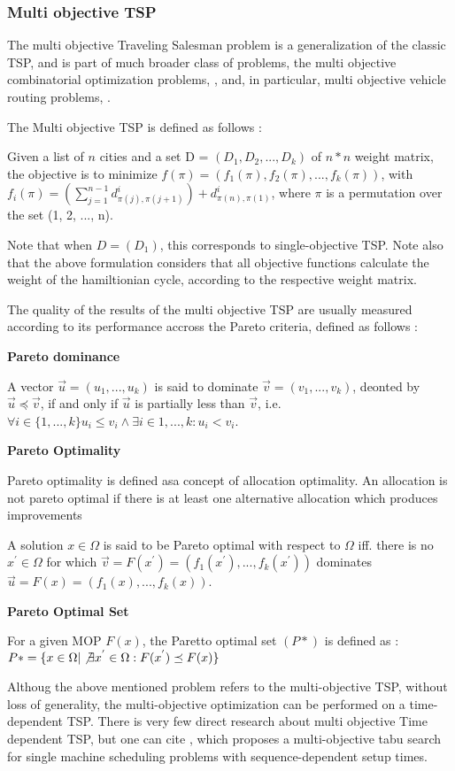 \subsubsection{Multi objective TSP}
\label{sec:multi-objective-tsp}

The multi objective Traveling Salesman problem is a generalization 
of the classic TSP, and is part of much broader class of problems, 
the multi objective combinatorial optimization problems, \cite{multi_objective_cop},
and, in particular, multi objective vehicle routing problems, \cite{multi_objective_vrp}.

The Multi objective TSP is defined as follows \cite{moea_for_motsp}:

Given a list of $n$ cities and a set D = $(D_1, D_2, ..., D_k)$ of $n*n$ weight matrix,
the objective is to minimize $f(\pi) = (f_1(\pi), f_2(\pi), ..., f_k(\pi))$,
with $f_i(\pi) = (\sum_{j=1}^{n-1} d_{\pi(j),\pi(j+1)}^i) + d_{\pi(n), \pi(1)}^i$,
where $\pi$ is a permutation over the set (1, 2, ..., n). 

Note that when $ D = (D_1)$, this corresponds to single-objective TSP.
Note also that the above formulation considers that all objective functions calculate the weight 
of the hamiltionian cycle, according to the respective weight matrix.

The quality of the results of the multi objective TSP are usually measured 
according to its performance accross the Pareto criteria, defined as follows \cite{pareto}:

\textbf{Pareto dominance}

A vector $\vec{u} = (u_1, ..., u_k)$ is said to dominate $\vec{v} = (v_1, ..., v_k)$,
deonted by $\vec{u} \preceq \vec{v}$, if and only if $\vec{u}$ is partially less than $\vec{v}$,
i.e. $\forall i \in \{1, ..., k\} u_i \leq v_i \land \exists i \in {1,...,k}: u_i < v_i$.

\textbf{Pareto Optimality}

Pareto optimality is defined asa concept of allocation optimality. An allocation 
is not pareto optimal if there is at least one alternative allocation which produces improvements 

A solution $x \in \Omega$ is said to be Pareto optimal with respect to $\Omega$
iff. there is no $x^{'} \in \Omega$ for which $\vec{v}=F(x^{'})=(f_1(x^{'}), ...,f_k(x^{'}))$ 
dominates $\vec{u}=F(x)=(f_1(x), ...,f_k(x))$.

\textbf{Pareto Optimal Set}

For a given MOP $F(x)$, the Paretto optimal set $(P*)$ is defined as :
$P* = \{ x \in \Omega | \not \exists x^{'} \in \Omega : F(x^{'}) \preceq F(x) \}  $


Althoug the above mentioned problem refers to the multi-objective TSP,
without loss of generality, the multi-objective optimization can be performed on a time-dependent TSP.
There is very few direct research about multi objective Time dependent TSP,
but one can cite \cite{multi_objective_machine_sequencing},
which proposes a multi-objective tabu search for single machine scheduling problems 
with sequence-dependent setup times.


